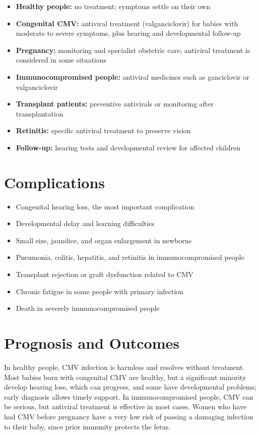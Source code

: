 \begin{itemize}
    \item \textbf{Healthy people:} no treatment; symptoms settle on their own
    \item \textbf{Congenital CMV:} antiviral treatment (valganciclovir) for babies with moderate to severe symptoms, plus hearing and developmental follow-up
    \item \textbf{Pregnancy:} monitoring and specialist obstetric care; antiviral treatment is considered in some situations
    \item \textbf{Immunocompromised people:} antiviral medicines such as ganciclovir or valganciclovir
    \item \textbf{Transplant patients:} preventive antivirals or monitoring after transplantation
    \item \textbf{Retinitis:} specific antiviral treatment to preserve vision
    \item \textbf{Follow-up:} hearing tests and developmental review for affected children
\end{itemize}

\section*{Complications}
\begin{itemize}
    \item Congenital hearing loss, the most important complication
    \item Developmental delay and learning difficulties
    \item Small size, jaundice, and organ enlargement in newborns
    \item Pneumonia, colitis, hepatitis, and retinitis in immunocompromised people
    \item Transplant rejection or graft dysfunction related to CMV
    \item Chronic fatigue in some people with primary infection
    \item Death in severely immunocompromised people
\end{itemize}

\section*{Prognosis and Outcomes}
In healthy people, CMV infection is harmless and resolves without treatment. Most babies born with congenital CMV are healthy, but a significant minority develop hearing loss, which can progress, and some have developmental problems; early diagnosis allows timely support. In immunocompromised people, CMV can be serious, but antiviral treatment is effective in most cases. Women who have had CMV before pregnancy have a very low risk of passing a damaging infection to their baby, since prior immunity protects the fetus.

